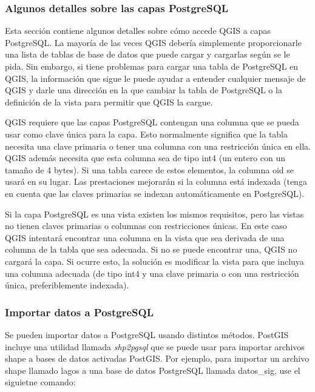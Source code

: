 \subsubsection{Algunos detalles sobre las capas PostgreSQL}\label{sec:postgis_details}

Esta sección contiene algunos detalles sobre cómo accede QGIS a capas PostgreSQL. La mayoría de las veces QGIS debería simplemente proporcionarle una lista de tablas de base de datos que puede cargar y cargarlas según se le pida. Sin embargo, si tiene problemas para cargar una tabla de PostgreSQL en QGIS, la información que sigue le puede ayudar a entender cualquier mensaje de QGIS y darle una dirección en la que cambiar la tabla de PostgreSQL o la definición de la vista para permitir que QGIS la cargue.

QGIS requiere que las capas PostgreSQL contengan una columna que se pueda usar como clave única para la capa. Esto normalmente significa que la tabla necesita una clave primaria o tener una columna con una restricción única en ella. QGIS además necesita que esta columna sea de tipo int4 (un entero con un tamaño de 4 bytes). Si una tabla carece de estos elementos, la columna oid se usará en su lugar. Las prestaciones mejorarán si la columna está indexada (tenga en cuenta que las claves primarias se indexan automáticamente en PostgreSQL).

Si la capa PostgreSQL es una vista existen los mismos requisitos, pero las vistas no tienen claves primarias o columnas con restricciones únicas. En este caso QGIS intentará encontrar una columna en la vista que sea derivada de una columna de la tabla que sea adecuada. Si no se puede encontrar una, QGIS no cargará la capa. Si ocurre esto, la solución es modificar la vista para que incluya una columna adecuada (de tipo int4 y una clave primaria o con una restricción única, preferiblemente indexada).

\subsubsection{Importar datos a PostgreSQL}\label{sec:loading_postgis_data}

Se pueden importar datos a PostgreSQL usando distintos métodos. PostGIS incluye una utilidad llamada \textsl{shp2pgsql} que se puede usar para importar archivos shape a bases de datos activadas PostGIS. Por ejemplo, para importar un archivo shape llamado lagos a una base de datos PostgreSQL llamada datos\_sig, use el siguietne comando:

